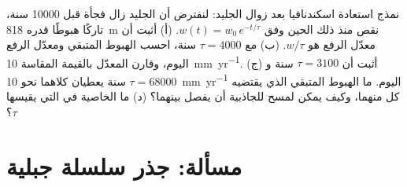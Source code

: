 \begin{exercise}[$\star\star\star$]\label{exo:b1:isostasy-gravity:12}
نمذج استعادة اسكندنافيا بعد زوال الجليد: لنفترض أن الجليد زال فجأة قبل \num{10000} سنة، تاركًا هبوطًا قدره \qty{818}{m} نقص منذ ذلك الحين وفق $w(t) = w_0\,e^{-t/\tau}$. (أ) أثبت أن معدّل الرفع هو $w/\tau$. (ب) مع $\tau = \num{4000}$ سنة، احسب الهبوط المتبقي ومعدّل الرفع اليوم، وقارن المعدّل بالقيمة المقاسة \qty{10}{mm.yr^{-1}}. (ج) أثبت أن $\tau = \num{3100}$ سنة و$\tau = \num{68000}$ سنة يعطيان كلاهما نحو \qty{10}{mm.yr^{-1}} اليوم. ما الهبوط المتبقي الذي يقتضيه كل منهما، وكيف يمكن لمسح للجاذبية أن يفصل بينهما؟ (د) ما الخاصية في  التي يقيسها $\tau$؟
\end{exercise}

\section{مسألة: جذر سلسلة جبلية}

